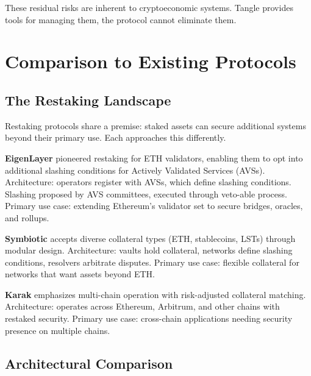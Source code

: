 \documentclass[11pt,a4paper]{article}
\begin{document}
These residual risks are inherent to cryptoeconomic systems. Tangle provides tools for managing them, the protocol cannot eliminate them.

\section{Comparison to Existing Protocols}

\subsection{The Restaking Landscape}

Restaking protocols share a premise: staked assets can secure additional systems beyond their primary use. Each approaches this differently.

\textbf{EigenLayer} pioneered restaking for ETH validators, enabling them to opt into additional slashing conditions for Actively Validated Services (AVSs). Architecture: operators register with AVSs, which define slashing conditions. Slashing proposed by AVS committees, executed through veto-able process. Primary use case: extending Ethereum's validator set to secure bridges, oracles, and rollups.

\textbf{Symbiotic} accepts diverse collateral types (ETH, stablecoins, LSTs) through modular design. Architecture: vaults hold collateral, networks define slashing conditions, resolvers arbitrate disputes. Primary use case: flexible collateral for networks that want assets beyond ETH.

\textbf{Karak} emphasizes multi-chain operation with risk-adjusted collateral matching. Architecture: operates across Ethereum, Arbitrum, and other chains with restaked security. Primary use case: cross-chain applications needing security presence on multiple chains.

\subsection{Architectural Comparison}
\end{document}
